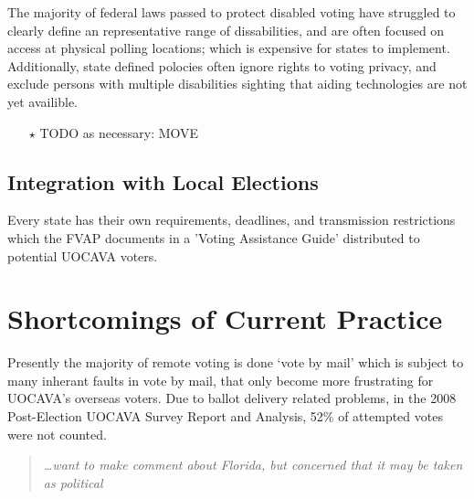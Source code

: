 The majority of federal laws passed to protect disabled voting have struggled to clearly define an representative range of dissabilities, and are often focused on access at physical polling locations; which is expensive for states to implement. Additionally, state defined polocies often ignore rights to voting privacy, and exclude persons with multiple disabilities sighting that aiding technologies are not yet availible.










\begin{itemize}
\item[$\star$] TODO as necessary: MOVE
\end{itemize}

\subsection{Integration with Local Elections}

Every state has their own requirements, deadlines, and transmission restrictions which the FVAP documents in a 'Voting Assistance Guide' distributed to potential UOCAVA voters. 

\section{Shortcomings of Current Practice}

Presently the majority of remote voting is done `vote by mail'  which is subject to many inherant faults in vote by mail, that only become more frustrating for UOCAVA's overseas voters. Due to ballot delivery related problems, in the 2008 Post-Election UOCAVA Survey Report and Analysis, 52\% of attempted votes were not counted. \begin{quote} {\em \ldots want to make comment about Florida, but concerned that it may be taken as political}\end{quote}

